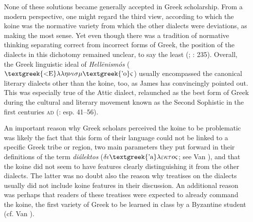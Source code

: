 None of these solutions became generally accepted in Greek scholarship. From a modern perspective, one might regard the third view, according to which the koine was the normative variety from which the other dialects were deviations, as making the most sense. Yet even though there was a tradition of normative thinking separating correct from incorrect forms of Greek, the position of the dialects in this dichotomy remained unclear, to say the least (\citealt{Versteegh1986}; \citealt{Dickey2007}: 235). Overall, the Greek linguistic ideal of \textit{Hellēnismós} ($\text{\textgreek{<E}}\lambda \lambda \eta \nu \iota \sigma \mu \text{\textgreek{'o}}\varsigma $) usually encompassed the canonical literary dialects other than the koine, too, as James \citet{Clackson2015} has convincingly pointed out. This was especially true of the Attic dialect, relaunched as the best form of Greek during the cultural and literary movement known as the Second Sophistic in the first centuries \textsc{ad} (\citealt{Whitmarsh2005}: esp. 41–56).

An important reason why Greek scholars perceived the koine to be problematic was likely the fact that this form of their language could not be linked to a specific Greek tribe or region, two main parameters they put forward in their definitions of the term \textit{diálektos} ($\delta \iota \text{\textgreek{'a}}\lambda \varepsilon \kappa \tau o\varsigma $; see Van \citealt{Rooy2016d}), and that the koine did not seem to have features clearly distinguishing it from the other dialects. The latter was no doubt also the reason why treatises on the dialects usually did not include koine features in their discussion. An additional reason was perhaps that readers of these treatises were expected to already command the koine, the first variety of Greek to be learned in class by a Byzantine student (cf. Van \citealt{Rooy2016b}).

